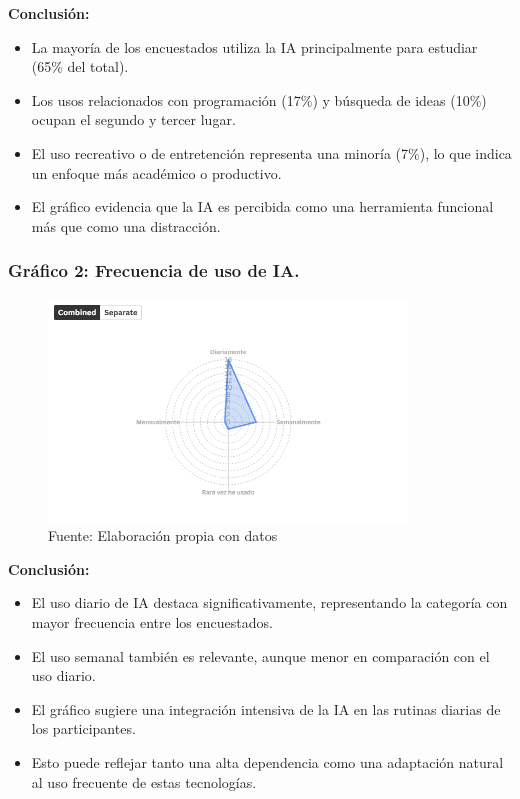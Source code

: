\documentclass[12pt, a4paper]{article}
\begin{document}
\textbf{Conclusión:}
\begin{itemize}
    \item La mayoría de los encuestados utiliza la IA principalmente para estudiar (65\% del total).
    \item Los usos relacionados con programación (17\%) y búsqueda de ideas (10\%) ocupan el segundo y tercer lugar.
    \item El uso recreativo o de entretención representa una minoría (7\%), lo que indica un enfoque más académico o productivo.
    \item El gráfico evidencia que la IA es percibida como una herramienta funcional más que como una distracción.
\end{itemize}

\subsubsection*{Gráfico 2: Frecuencia de uso de IA.}
\begin{figure}[H]
    \centering
    \includegraphics[width=0.85\textwidth]{Graficos/Radar_frec_ia_FC.png}
    \caption[2]{Fuente: Elaboración propia con datos}
\end{figure}

\textbf{Conclusión:}
\begin{itemize}
    \item El uso diario de IA destaca significativamente, representando la categoría con mayor frecuencia entre los encuestados.
    \item El uso semanal también es relevante, aunque menor en comparación con el uso diario.
    \item El gráfico sugiere una integración intensiva de la IA en las rutinas diarias de los participantes.
    \item Esto puede reflejar tanto una alta dependencia como una adaptación natural al uso frecuente de estas tecnologías.
\end{itemize}
\end{document}
